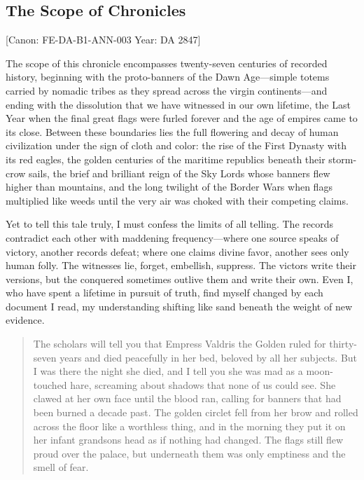 \subsection{The Scope of Chronicles}\label{the-scope-of-chronicles}

{[}Canon: FE-DA-B1-ANN-003 \textbar{} Year: DA 2847{]}

The scope of this chronicle encompasses twenty-seven centuries of
recorded history, beginning with the proto-banners of the Dawn
Age---simple totems carried by nomadic tribes as they spread across the
virgin continents---and ending with the dissolution that we have
witnessed in our own lifetime, the Last Year when the final great flags
were furled forever and the age of empires came to its close. Between
these boundaries lies the full flowering and decay of human civilization
under the sign of cloth and color: the rise of the First Dynasty with
its red eagles, the golden centuries of the maritime republics beneath
their storm-crow sails, the brief and brilliant reign of the Sky Lords
whose banners flew higher than mountains, and the long twilight of the
Border Wars when flags multiplied like weeds until the very air was
choked with their competing claims.

Yet to tell this tale truly, I must confess the limits of all telling.
The records contradict each other with maddening frequency---where one
source speaks of victory, another records defeat; where one claims
divine favor, another sees only human folly. The witnesses lie, forget,
embellish, suppress. The victors write their versions, but the conquered
sometimes outlive them and write their own. Even I, who have spent a
lifetime in pursuit of truth, find myself changed by each document I
read, my understanding shifting like sand beneath the weight of new
evidence.

\begin{quote}
The scholars will tell you that Empress Valdris the Golden ruled for
thirty-seven years and died peacefully in her bed, beloved by all her
subjects. But I was there the night she died, and I tell you she was mad
as a moon-touched hare, screaming about shadows that none of us could
see. She clawed at her own face until the blood ran, calling for banners
that had been burned a decade past. The golden circlet fell from her
brow and rolled across the floor like a worthless thing, and in the
morning they put it on her infant grandson\textquotesingle s head as if
nothing had changed. The flags still flew proud over the palace, but
underneath them was only emptiness and the smell of fear.
\end{quote}

